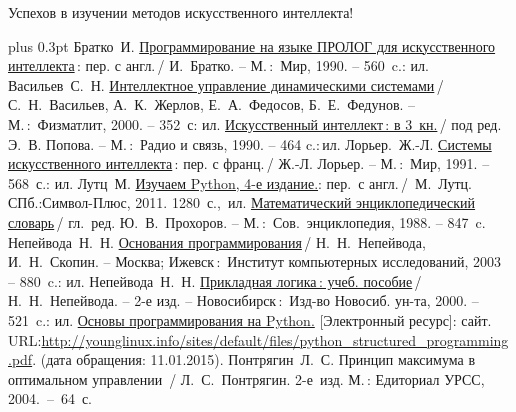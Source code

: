 \documentclass[a4paper,14pt, openany, twoside, final]{extbook} %
\def\emphbib#1{#1}
\begin{document}
Успехов в изучении методов искусственного интеллекта!


\begin{thebibliography}{99}\itemsep1pt \parskip 0pt plus 0.3pt
 Братко~И. \emphbib{\href{http://royallib.ru/book/bratko_ivan/programmirovanie_na_yazike_prolog_dlya_iskusstvennogo_intellekta.html}{Программирование на языке ПРОЛОГ для искусственного интеллекта}}\,{}: пер. с англ.\,/ И.~Братко. -- М.\,:~Мир, 1990. -- 560~c.: ил.
 Васильев~С.~Н. \emphbib{\href{http://bookfi.org/book/616050}{Интеллектное управление динамическими системами}}\,{}/ С.~Н.~Васильев, А.~К.~Жерлов, Е.~А.~Федосов, Б.~Е.~Федунов. -- М.\,:~Физматлит, 2000. -- 352~с: ил.
 \emphbib{\href{http://aihandbook.intsys.org.ru/index.php/intro/ai-handbook}{Искусственный интеллект\,{}: в 3~кн.}}\,{}/ под ред. Э.~В. Попова. -- М.\,:~Радио и связь, 1990. -- 464 c.:\,{}ил.
 Лорьер.~Ж.-Л.  \emphbib{\href{http://publ.lib.ru/ARCHIVES/L/LOR'ER_Jan_Lui/_Lor'er_J.L..html}{Системы искусственного интеллекта}\,{}: пер. с франц.}\,{}/ Ж.-Л. Лорьер. -- М.\,:~Мир, 1991. -- 568~с.: ил.
Лутц~М.  \href{https://vk.com/doc10903696_196246835?hash=4b80f3cf914c7d65dd&dl=f90686bee18e565271}{Изучаем Python, 4-е издание.}: пер.~с англ.\,/~М.~Лутц. СПб.:Символ-Плюс, 2011. 1280~с.,~ил.
 \emphbib{\href{https://yadi.sk/d/my-FN0fkM43aE}{Математический энциклопедический словарь}}\,{}/ гл.~ред. Ю.~В.~Прохоров. -- М.\,:~Сов.~энциклопедия, 1988. -- 847~c.
 Непейвода~Н.~Н.  \emphbib{\href{http://philosophy.ru/library/logic_math/library/nepeivoda_prog.pdf}{Основания программирования}}\,{}/ Н.~Н.~Непейвода, И.~Н.~Скопин. -- Москва; Ижевск\,{}:~Институт компьютерных исследований, 2003 -- 880~c.: ил.
 Непейвода~Н.~Н. \emphbib{\href{http://www.logic-books.info/taxonomy/term/215}{Прикладная логика\,{}: учеб. пособие}}\,{}/ Н.~Н.~Непейвода. -- 2-е изд. -- Новосибирск\,{}:~Изд-во Новосиб. ун-та, 2000. -- 521~c.: ил.
 \href{http://younglinux.info/sites/default/files/python_structured_programming.pdf}{Основы программирования на Python.}  [Электронный ресурс]: сайт. URL:\url{http://younglinux.info/sites/default/files/python_structured_programming.pdf}. (дата обращения: 11.01.2015).
 Понтрягин~Л.~С. Принцип максимума в оптимальном управлении \,/ Л.~С.~Понтрягин.  2-е~изд. М.\,: Едиториал УРСС,  2004.~--~64~с.

\end{thebibliography}
\end{document}
